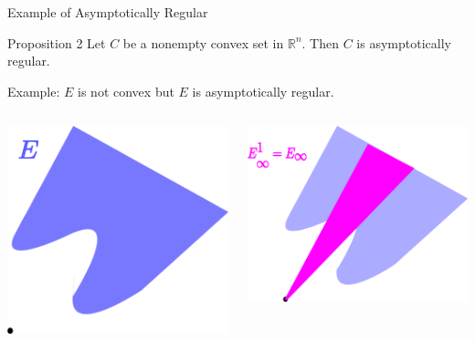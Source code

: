 \documentclass[aspectratio=169, dvipdfmx, 11pt]{beamer} %
\newcommand{\NDemenstionalRealEuclidianSpace}{\mathbb{R}^n}
\begin{document}
\begin{frame}{Example of Asymptotically Regular}
  \begin{block}{Proposition 2}
    Let $C$ be a nonempty convex set in $\NDemenstionalRealEuclidianSpace$. Then $C$ is asymptotically regular.
  \end{block}

  Example: $E$ is not convex but $E$ is asymptotically regular.

  \medskip

  \centering
  \begin{columns}
    \begin{column}{0.48\textwidth}
    \centering
    \includegraphics[keepaspectratio, scale=0.095]{figures/example_not_convex_asymptotically_regular_1.eps}
    \end{column}
    \pause
    \begin{column}{0.48\textwidth}
    \centering
    \includegraphics[keepaspectratio, scale=0.095]{figures/example_not_convex_asymptotically_regular_2.eps}

\end{column}
\end{columns}
\end{frame}
\end{document}
